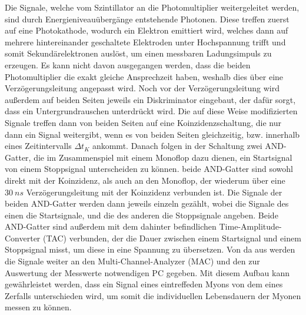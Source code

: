 Die Signale, welche vom Szintillator an die Photomultiplier weitergeleitet werden, sind durch Energieniveauübergänge entstehende Photonen. Diese treffen zuerst auf eine Photokathode,
wodurch ein Elektron emittiert wird, welches dann auf mehrere hintereinander geschaltete Elektroden unter Hochspannung trifft und somit Sekundärelektronen auslöst, um einen messbaren
Ladungsimpuls zu erzeugen. Es kann nicht davon ausgegangen werden, dass die beiden Photomultiplier die exakt gleiche Ansprechzeit haben, weshalb dies über eine Verzögerungsleitung 
angepasst wird. Noch vor der Verzögerungsleitung wird außerdem auf beiden Seiten jeweils ein Diskriminator eingebaut, der dafür sorgt, dass ein Untergrundrauschen unterdrückt wird.
Die auf diese Weise modifizierten Signale treffen dann von beiden Seiten auf eine Koinzidenzschaltung, die nur dann ein Signal weitergibt, wenn es von beiden Seiten gleichzeitig,
bzw. innerhalb eines Zeitintervalls $\Delta t_K $ ankommt. 
Danach folgen in der Schaltung zwei AND-Gatter, die im Zusammenspiel mit einem Monoflop dazu dienen, ein Startsignal von einem Stoppsignal unterscheiden zu können. beide AND-Gatter
sind sowohl direkt mit der Koinzidenz, als auch an den Monoflop, der wiederum über eine $\SI{30}{ns}$ Verzögerungsleitung mit der Koinzidenz verbunden ist. Die Signale der beiden 
AND-Gatter werden dann jeweils einzeln gezählt, wobei die Signale des einen die Startsignale, und die des anderen die Stoppsignale angeben. Beide AND-Gatter sind außerdem mit 
dem dahinter befindlichen Time-Amplitude-Converter (TAC) verbunden, der die Dauer zwischen einem Startsignal und einem Stoppsignal misst, um diese in eine Spannung zu 
übersetzen. Von da aus werden die Signale weiter an den Multi-Channel-Analyzer (MAC) und den zur Auswertung der Messwerte notwendigen PC gegeben. Mit diesem Aufbau kann 
gewährleistet werden, dass ein Signal eines eintreffeden Myons von dem eines Zerfalls unterschieden wird, um somit die individuellen Lebensdauern der Myonen messen zu können. 
